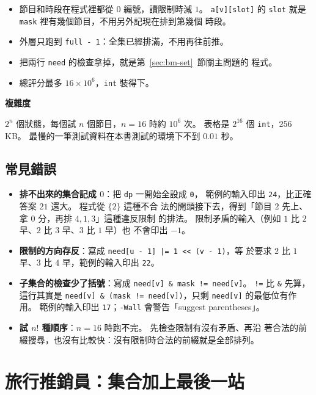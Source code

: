 \begin{itemize}
\item 節目和時段在程式裡都從 $0$ 編號，讀限制時減 $1$。 \texttt{a[v][slot]}
的 \texttt{slot} 就是 \texttt{mask} 裡有幾個節目，不用另外記現在排到第幾個
時段。
\item 外層只跑到 \texttt{full - 1}：全集已經排滿，不用再往前推。
\item 把兩行 \texttt{need} 的檢查拿掉，就是第~\ref{sec:bm-set}~節關主問題的
程式。
\item 總評分最多 $16 \times 10^6$，\texttt{int} 裝得下。
\end{itemize}

\textbf{複雜度}

$2^n$ 個狀態，每個試 $n$ 個節目，$n = 16$ 時約 $10^6$ 次。 表格是 $2^{16}$
個 \texttt{int}，$256$ KB。 最慢的一筆測試資料在本書測試的環境下不到 $0.01$ 秒。

\subsection{常見錯誤}

\begin{itemize}
\item \textbf{排不出來的集合記成 $0$}：把 \texttt{dp} 一開始全設成 \texttt{0}，
範例的輸入印出 \texttt{24}，比正確答案 $21$ 還大。 程式從 $\{2\}$ 這種不合
法的開頭接下去，得到「節目 $2$ 先上、拿 $0$ 分，再排 $4, 1, 3$」這種違反限制
的排法。 限制矛盾的輸入（例如 $1$ 比 $2$ 早、$2$ 比 $3$ 早、$3$ 比 $1$ 早）也
不會印出 $-1$。
\item \textbf{限制的方向存反}：寫成 \texttt{need[u - 1] |= 1 << (v - 1)}，等
於要求 $2$ 比 $1$ 早、$3$ 比 $4$ 早，範例的輸入印出 \texttt{22}。
\item \textbf{子集合的檢查少了括號}：寫成 \texttt{need[v] \& mask != need[v]}。
\texttt{!=} 比 \texttt{\&} 先算，這行其實是
\texttt{need[v] \& (mask != need[v])}，只剩 \texttt{need[v]} 的最低位有作用。
範例的輸入印出 \texttt{17}；\texttt{-Wall} 會警告「suggest parentheses」。
\item \textbf{試 $n!$ 種順序}：$n = 16$ 時跑不完。 先檢查限制有沒有矛盾、再沿
著合法的前綴搜尋，也沒有比較快：沒有限制時合法的前綴就是全部排列。
\end{itemize}

\section{旅行推銷員：集合加上最後一站}
\label{sec:bm-tsp}

